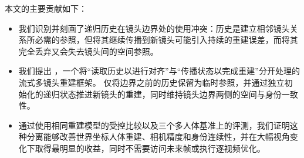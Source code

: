 本文的主要贡献如下：

\begin{itemize}
  \item 我们识别并刻画了递归历史在镜头边界处的使用冲突：历史是建立相邻镜头关系所必需的参照，但将其继续传播到新镜头可能引入持续的重建误差，而将其完全丢弃又会失去镜头间的空间参照。
  \item 我们提出 \method{}，一个将“读取历史以进行对齐”与“传播状态以完成重建”分开处理的流式多镜头重建框架。\method{} 仅将边界之前的历史保留为临时参照，并通过独立初始化的递归状态推进新镜头的重建，同时维持镜头边界两侧的空间与身份一致性。
  \item 通过使用相同重建模型的受控比较以及三个多人体基准上的评测，我们证明这种分离能够改善世界坐标人体重建、相机精度和身份连续性，并在大幅视角变化下取得最明显的收益，同时不需要访问未来帧或执行逐视频优化。
\end{itemize}
